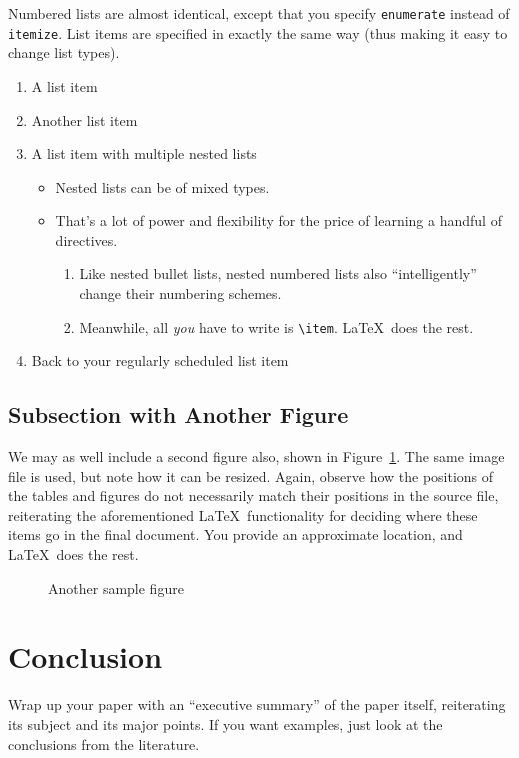 \documentclass{article}
\begin{document}
Numbered lists are almost identical, except that you specify \verb!enumerate! instead of \verb!itemize!.  List items are specified in exactly the same way (thus making it easy to change list types).

\begin{enumerate}
\item A list item
\item Another list item
\item A list item with multiple nested lists

\begin{itemize}
\item Nested lists can be of mixed types.
\item That's a lot of power and flexibility for the price of learning a handful of directives.

\begin{enumerate}
\item Like nested bullet lists, nested numbered lists also ``intelligently'' change their numbering schemes.
\item Meanwhile, all \emph{you} have to write is \verb!\item!.  \LaTeX\ does the rest.
\end{enumerate}
\end{itemize}

\item Back to your regularly scheduled list item

\end{enumerate}

\subsection{Subsection with Another Figure}

We may as well include a second figure also, shown in Figure~\ref{figure-sample2}.  The same image file is used, but note how it can be resized.  Again, observe how the positions of the tables and figures do not necessarily match their positions in the source file, reiterating the aforementioned \LaTeX\ functionality for deciding where these items go in the final document.  You provide an approximate location, and \LaTeX\ does the rest.

\begin{figure}
\centering


\caption{Another sample figure}
\label{figure-sample2}
\end{figure}

\section{Conclusion}

Wrap up your paper with an ``executive summary'' of the paper itself, reiterating its subject and its major points.  If you want examples, just look at the conclusions from the literature.



\end{document}
